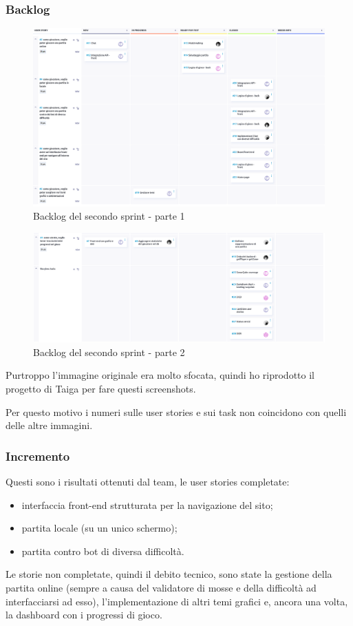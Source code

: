 \documentclass{article}
\begin{document}
\subsubsection{Backlog}
\begin{figure}[H]
    \centering
    \includegraphics[width=1\textwidth]{backlog2_1}
    \caption{Backlog del secondo sprint - parte 1}
    \label{fig:backlog2_1}
\end{figure}

\begin{figure}[H]
    \centering
    \includegraphics[width=1\textwidth]{backlog2_2}
    \caption{Backlog del secondo sprint - parte 2}
    \label{fig:backlog2}
\end{figure}

Purtroppo l'immagine originale era molto sfocata, quindi ho riprodotto il progetto di Taiga per fare questi screenshots.

Per questo motivo i numeri sulle user stories e sui task non coincidono con quelli delle altre immagini.

\subsubsection{Incremento}
Questi sono i risultati ottenuti dal team, le user stories completate:
\begin{itemize}
    \item interfaccia front-end strutturata per la navigazione del sito;
    \item partita locale (su un unico schermo);
    \item partita contro bot di diversa difficoltà.
\end{itemize}
Le storie non completate, quindi il debito tecnico, sono state la gestione della partita online (sempre a causa del validatore
di mosse e della difficoltà ad interfacciarsi ad esso), l'implementazione di altri temi grafici e, ancora una volta, la dashboard
con i progressi di gioco.
\end{document}
